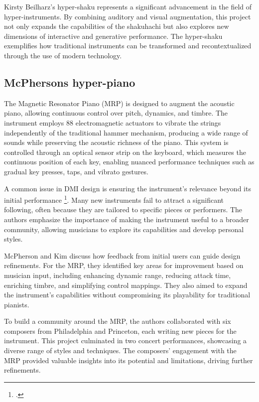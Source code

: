 \documentclass[12pt,twoside,maitrise]{dms_ks}
\theoremstyle{definition}
\begin{document}
Kirsty Beilharz's hyper-shaku represents a significant advancement in the field of hyper-instruments. 
By combining auditory and visual augmentation, this project not only expands the capabilities of the shakuhachi but also explores new dimensions of interactive and generative performance. 
The hyper-shaku exemplifies how traditional instruments can be transformed and recontextualized through the use of modern technology.

\subsection{McPhersons hyper-piano}

The Magnetic Resonator Piano (MRP) is designed to augment the acoustic piano, allowing continuous control over pitch, dynamics, and timbre. 
The instrument employs 88 electromagnetic actuators to vibrate the strings independently of the traditional hammer mechanism, producing a wide range of sounds while preserving the acoustic richness of the piano. 
This system is controlled through an optical sensor strip on the keyboard, which measures the continuous position of each key, enabling nuanced performance techniques such as gradual key presses, taps, and vibrato gestures.

A common issue in DMI design is ensuring the instrument's relevance beyond its initial performance \footcite{mcpherson_problem_2012}. 
Many new instruments fail to attract a significant following, often because they are tailored to specific pieces or performers. 
The authors emphasize the importance of making the instrument useful to a broader community, allowing musicians to explore its capabilities and develop personal styles.

McPherson and Kim discuss how feedback from initial users can guide design refinements. 
For the MRP, they identified key areas for improvement based on musician input, including enhancing dynamic range, reducing attack time, enriching timbre, and simplifying control mappings. 
They also aimed to expand the instrument's capabilities without compromising its playability for traditional pianists.

To build a community around the MRP, the authors collaborated with six composers from Philadelphia and Princeton, each writing new pieces for the instrument. 
This project culminated in two concert performances, showcasing a diverse range of styles and techniques. 
The composers' engagement with the MRP provided valuable insights into its potential and limitations, driving further refinements.
\end{document}
